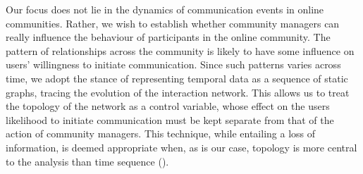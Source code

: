 Our focus does not lie in the dynamics of communication events in online communities. Rather, we wish to establish whether  community managers can really influence the behaviour of participants in the online community. The pattern of relationships across the community is likely to have some influence on users' willingness to initiate communication. Since such patterns varies across time, we adopt the stance of representing temporal data as a sequence of static graphs, tracing the evolution of the interaction network. This allows us to treat the topology of the network as a control variable, whose effect on the users likelihood to initiate communication must be kept separate from that of the action of community managers. This technique, while entailing a loss of information, is deemed appropriate when, as is our case, topology is more central to the analysis than time sequence (\cite{rosvall2010mapping}).
